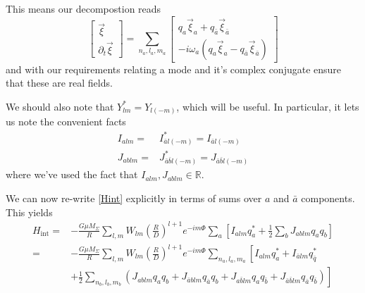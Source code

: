 This means our decompostion reads
\begin{equation}
\begin{bmatrix} \vec{\xi} \\ \partial_t \vec{\xi} \end{bmatrix}
= 
\sum_{n_a,l_a,m_a} \begin{bmatrix} q_a\vec{\xi}_a + q_{\bar{a}}\vec{\xi}_{\bar{a}} \\ -i\omega_a\left( q_a\vec{\xi}_a - q_{\bar{a}}\vec{\xi}_{\bar{a}} \right) \end{bmatrix}
\end{equation}
and with our requirements relating a mode and it's complex conjugate ensure that these are real fields.

We should also note that $Y_{lm}^\ast = Y_{l(-m)}$, which will be useful. In particular, it lets us note the convenient facts
\begin{subequations}
\begin{align}
I_{alm}  = & I_{\bar{a}l(-m)}^\ast = I_{\bar{a}l(-m)}\\
J_{ablm}  = & J_{\bar{a}\bar{b}l(-m)}^\ast = J_{\bar{a}\bar{b}l(-m)}
\end{align}
\end{subequations}
where we've used the fact that $I_{alm},J_{ablm} \in \mathbb{R}$. 

We can now re-write \ref{Hint} explicitly in terms of sums over $a$ and $\bar{a}$ components. This yields
\begin{subequations}
\begin{align}
H_{\mathrm{int}}  = & - \frac{G \mu M_{\Sigma}}{R} \sum_{l,m} W_{lm} \left(\frac{R}{D}\right)^{l+1} e^{-i m \Phi} \sum_{a} \left[I_{alm} q_a^\ast + \frac{1}{2}\sum_{b} J_{ablm} q_a q_b \right] \\
                  = & - \frac{G \mu M_{\Sigma}}{R} \sum_{l,m} W_{lm} \left(\frac{R}{D}\right)^{l+1} e^{-i m \Phi} \sum_{n_a, l_a, m_a} \left[I_{alm}q_a^\ast + I_{\bar{a}lm}q_{\bar{q}}^\ast \right. \\ 
                    & \left. + \frac{1}{2}\sum_{n_b,l_b,m_b} \left(J_{ablm}q_aq_b + J_{\bar{a}blm}q_{\bar{a}}q_b + J_{a\bar{b}lm}q_a q_{\bar{b}} + J_{\bar{a}\bar{b}lm}q_{\bar{a}}q_{\bar{b}} \right) \right]
\end{align}
\end{subequations}

